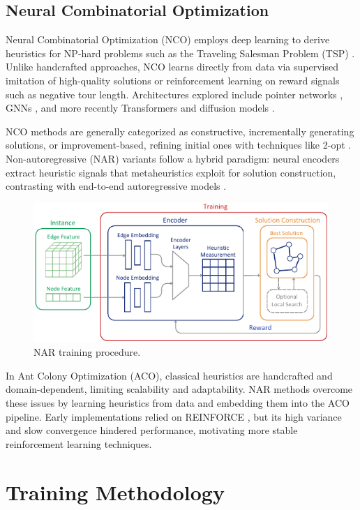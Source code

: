 \documentclass[a4paper,conference]{IEEEtran}
\begin{document}
\subsection{Neural Combinatorial Optimization}
Neural Combinatorial Optimization (NCO) employs deep learning to derive heuristics for NP-hard problems such as the Traveling Salesman Problem (TSP) \cite{MLCO}. Unlike handcrafted approaches, NCO learns directly from data via supervised imitation of high-quality solutions or reinforcement learning on reward signals such as negative tour length. Architectures explored include pointer networks \cite{pointernetwork}, GNNs \cite{gnn}, and more recently Transformers \cite{transformer} and diffusion models \cite{difusco}.

NCO methods are generally categorized as constructive, incrementally generating solutions, or improvement-based, refining initial ones with techniques like 2-opt \cite{NCO}. Non-autoregressive (NAR) variants follow a hybrid paradigm: neural encoders extract heuristic signals that metaheuristics exploit for solution construction, contrasting with end-to-end autoregressive models \cite{RL4CO}.

\begin{figure}[H]
  \centering
  \includegraphics[width=\linewidth]{DACO.pdf}
  \caption{NAR training procedure.}
  \label{fig:DACO}
\end{figure}

In Ant Colony Optimization (ACO), classical heuristics are handcrafted and domain-dependent, limiting scalability and adaptability. NAR methods overcome these issues by learning heuristics from data and embedding them into the ACO pipeline. Early implementations relied on REINFORCE \cite{REINFORCE}, but its high variance and slow convergence hindered performance, motivating more stable reinforcement learning techniques.

\section{Training Methodology}
\end{document}
